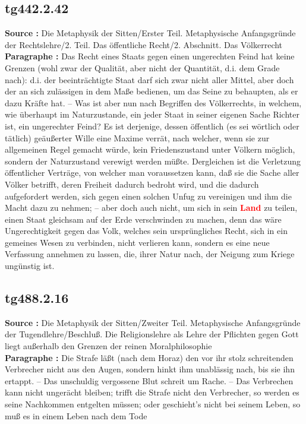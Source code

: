 \documentclass[a4paper,12pt,twoside]{book}
\newcommand{\match}[1]{\textcolor{red}{\textbf{#1}}}
\begin{document}
	\subsection*{tg442.2.42} 
	\textbf{Source : }Die Metaphysik der Sitten/Erster Teil. Metaphysische Anfangsgründe der Rechtslehre/2. Teil. Das öffentliche Recht/2. Abschnitt. Das Völkerrecht\\  
	
	\textbf{Paragraphe : }Das Recht eines Staats gegen einen ungerechten Feind hat keine Grenzen (wohl zwar der Qualität, aber nicht der Quantität, d.i. dem Grade nach): d.i. der beeinträchtigte Staat darf sich zwar nicht aller Mittel, aber doch der an sich zulässigen in dem Maße bedienen, um das Seine zu behaupten, als er dazu Kräfte hat. – Was ist aber nun nach Begriffen des Völkerrechts, in welchem, wie überhaupt im Naturzustande, ein jeder Staat in seiner eigenen Sache Richter ist, ein ungerechter Feind? Es ist derjenige, dessen öffentlich (es sei wörtlich oder tätlich) geäußerter Wille eine Maxime verrät, nach welcher, wenn sie zur allgemeinen Regel gemacht würde, kein Friedenszustand unter Völkern möglich, sondern der Naturzustand verewigt werden müßte. Dergleichen ist die Verletzung öffentlicher Verträge, von welcher man voraussetzen kann, daß sie die Sache aller Völker betrifft, deren Freiheit dadurch bedroht wird, und die dadurch aufgefordert werden, sich gegen einen solchen Unfug zu vereinigen und ihm die Macht dazu zu nehmen; – aber doch auch nicht, um sich in sein \match{Land} zu teilen, einen Staat gleichsam auf der Erde verschwinden zu machen, denn das wäre Ungerechtigkeit gegen das Volk, welches sein ursprüngliches Recht, sich in ein gemeines Wesen zu verbinden, nicht verlieren kann, sondern es eine neue Verfassung annehmen zu lassen, die, ihrer Natur nach, der Neigung zum Kriege ungünstig ist. 
	
	\subsection*{tg488.2.16} 
	\textbf{Source : }Die Metaphysik der Sitten/Zweiter Teil. Metaphysische Anfangsgründe der Tugendlehre/Beschluß. Die Religionslehre als Lehre der Pflichten gegen Gott liegt außerhalb den Grenzen der reinen Moralphilosophie\\  
	
	\textbf{Paragraphe : }Die Strafe läßt (nach dem Horaz) den vor ihr stolz schreitenden Verbrecher nicht aus den Augen, sondern hinkt ihm unablässig nach, bis sie ihn ertappt. – Das unschuldig vergossene Blut schreit um Rache. – Das Verbrechen kann nicht ungerächt bleiben; trifft die Strafe nicht den Verbrecher, so werden es seine Nachkommen entgelten müssen; oder geschieht's nicht bei seinem Leben, so muß es in einem Leben nach dem Tode
	
\end{document}
